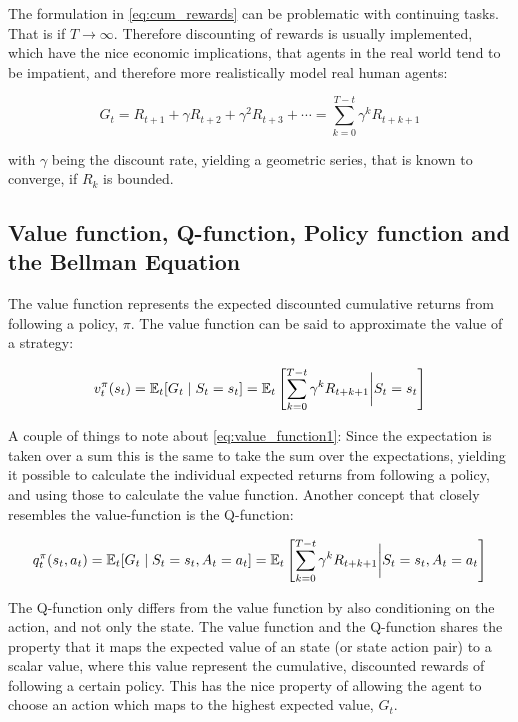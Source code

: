 The formulation in \eqref{eq:cum_rewards} can be problematic with continuing tasks. That is if $T \rightarrow \infty$. Therefore discounting of rewards is usually implemented, which have the nice economic implications, that agents in the real world tend to be impatient, and therefore more realistically model real human agents:

\begin{equation}
    G_t = R_{t+1} + \gamma R_{t+2} + \gamma^2 R_{t+3} + \cdots = \sum_{k=0}^{T - t} \gamma^k R_{t+k+1}
\end{equation}

with $\gamma$ being the discount rate, yielding a geometric series, that is known to converge, if $R_k$ is bounded.

\subsection{Value function, Q-function, Policy function and the Bellman Equation}

The value function represents the expected discounted cumulative returns from following a policy, $\pi$. The value function can be said to approximate the value of a strategy:

\begin{equation}\label{eq:value_function1}
    v_{t}^{\pi}(s_t) = \mathbb{E}_t [G_t \mid S_t = s_t] = \mathbb{E}_t \left[ \sum_{k=0}^{T - t} \gamma^k R_{t+k+1} \bigg\vert S_t = s_t \right] 
\end{equation}


A couple of things to note about \eqref{eq:value_function1}: Since the expectation is taken over a sum this is the same to take the sum over the expectations, yielding it possible to calculate the individual expected returns from following a policy, and using those to calculate the value function. Another concept that closely resembles the value-function is the Q-function:

\begin{equation}
    q_t^{\pi} (s_t, a_t) = \mathbb{E}_t [G_t \mid S_t = s_t, A_t = a_t ] = \mathbb{E}_t \left[ \sum_{k=0}^{T - t} \gamma^k R_{t+k+1} \bigg\vert S_t = s_t, A_t = a_t\right] 
\end{equation}

The Q-function only differs from the value function by also conditioning on the action, and not only the state. The value function and the Q-function shares the property that it maps the expected value of an state (or state action pair) to a scalar value, where this value represent the cumulative, discounted rewards of following a certain policy. This has the nice property of allowing the agent to choose an action which maps to the highest expected value, $G_t$.

